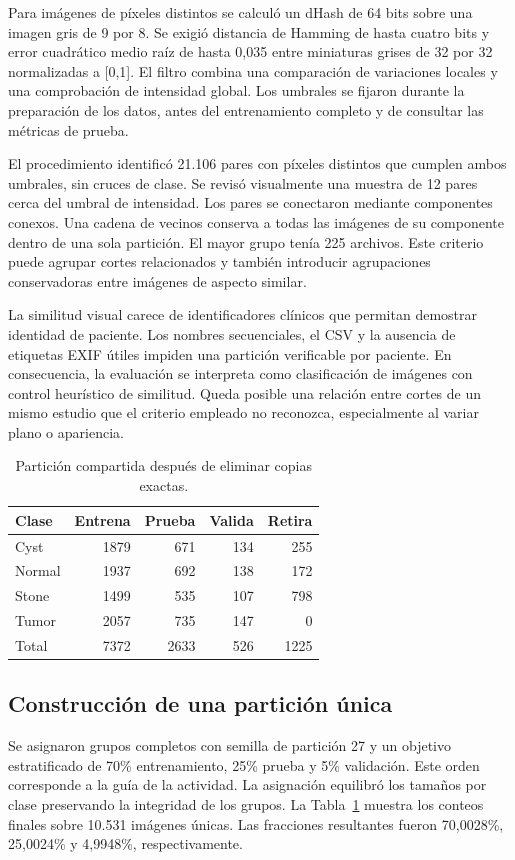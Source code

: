 \documentclass[conference]{IEEEtran}
\begin{document}
Para imágenes de píxeles distintos se calculó un dHash de 64 bits sobre una imagen gris de 9 por 8. Se exigió distancia de Hamming de hasta cuatro bits y error cuadrático medio raíz de hasta 0,035 entre miniaturas grises de 32 por 32 normalizadas a [0,1]. El filtro combina una comparación de variaciones locales y una comprobación de intensidad global. Los umbrales se fijaron durante la preparación de los datos, antes del entrenamiento completo y de consultar las métricas de prueba.

El procedimiento identificó 21.106 pares con píxeles distintos que cumplen ambos umbrales, sin cruces de clase. Se revisó visualmente una muestra de 12 pares cerca del umbral de intensidad. Los pares se conectaron mediante componentes conexos. Una cadena de vecinos conserva a todas las imágenes de su componente dentro de una sola partición. El mayor grupo tenía 225 archivos. Este criterio puede agrupar cortes relacionados y también introducir agrupaciones conservadoras entre imágenes de aspecto similar.

La similitud visual carece de identificadores clínicos que permitan demostrar identidad de paciente. Los nombres secuenciales, el CSV y la ausencia de etiquetas EXIF útiles impiden una partición verificable por paciente. En consecuencia, la evaluación se interpreta como clasificación de imágenes con control heurístico de similitud. Queda posible una relación entre cortes de un mismo estudio que el criterio empleado no reconozca, especialmente al variar plano o apariencia.

\begin{table}[t]
\caption{Partición compartida después de eliminar copias exactas.}
\label{tab:split}\centering
\begin{tabular}{lrrrr}\toprule
Clase & Entrena & Prueba & Valida & Retira\\\midrule
Cyst & 1879 & 671 & 134 & 255\\
Normal & 1937 & 692 & 138 & 172\\
Stone & 1499 & 535 & 107 & 798\\
Tumor & 2057 & 735 & 147 & 0\\\midrule
Total & 7372 & 2633 & 526 & 1225\\\bottomrule
\end{tabular}
\end{table}
\subsection{Construcción de una partición única}
Se asignaron grupos completos con semilla de partición 27 y un objetivo estratificado de 70\% entrenamiento, 25\% prueba y 5\% validación. Este orden corresponde a la guía de la actividad. La asignación equilibró los tamaños por clase preservando la integridad de los grupos. La Tabla~\ref{tab:split} muestra los conteos finales sobre 10.531 imágenes únicas. Las fracciones resultantes fueron 70,0028\%, 25,0024\% y 4,9948\%, respectivamente.
\end{document}
